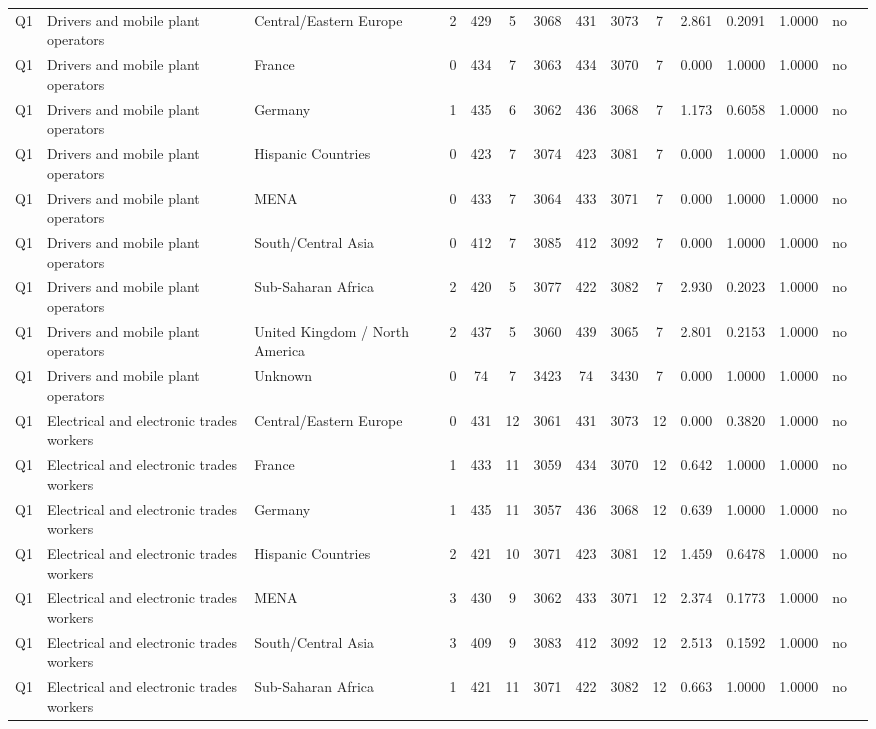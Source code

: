 \begin{longtable}{lllrcccccccccll}
Q1 & Drivers and mobile plant operators & Central/Eastern Europe & 2 & 429 & 5 & 3068 & 431 & 3073 & 7 & 2.861 & 0.2091 & 1.0000 & no \\
Q1 & Drivers and mobile plant operators & France & 0 & 434 & 7 & 3063 & 434 & 3070 & 7 & 0.000 & 1.0000 & 1.0000 & no \\
Q1 & Drivers and mobile plant operators & Germany & 1 & 435 & 6 & 3062 & 436 & 3068 & 7 & 1.173 & 0.6058 & 1.0000 & no \\
Q1 & Drivers and mobile plant operators & Hispanic Countries & 0 & 423 & 7 & 3074 & 423 & 3081 & 7 & 0.000 & 1.0000 & 1.0000 & no \\
Q1 & Drivers and mobile plant operators & MENA & 0 & 433 & 7 & 3064 & 433 & 3071 & 7 & 0.000 & 1.0000 & 1.0000 & no \\
Q1 & Drivers and mobile plant operators & South/Central Asia & 0 & 412 & 7 & 3085 & 412 & 3092 & 7 & 0.000 & 1.0000 & 1.0000 & no \\
Q1 & Drivers and mobile plant operators & Sub-Saharan Africa & 2 & 420 & 5 & 3077 & 422 & 3082 & 7 & 2.930 & 0.2023 & 1.0000 & no \\
Q1 & Drivers and mobile plant operators & United Kingdom / North America & 2 & 437 & 5 & 3060 & 439 & 3065 & 7 & 2.801 & 0.2153 & 1.0000 & no \\
Q1 & Drivers and mobile plant operators & Unknown & 0 & 74 & 7 & 3423 & 74 & 3430 & 7 & 0.000 & 1.0000 & 1.0000 & no \\
Q1 & Electrical and electronic trades workers & Central/Eastern Europe & 0 & 431 & 12 & 3061 & 431 & 3073 & 12 & 0.000 & 0.3820 & 1.0000 & no \\
Q1 & Electrical and electronic trades workers & France & 1 & 433 & 11 & 3059 & 434 & 3070 & 12 & 0.642 & 1.0000 & 1.0000 & no \\
Q1 & Electrical and electronic trades workers & Germany & 1 & 435 & 11 & 3057 & 436 & 3068 & 12 & 0.639 & 1.0000 & 1.0000 & no \\
Q1 & Electrical and electronic trades workers & Hispanic Countries & 2 & 421 & 10 & 3071 & 423 & 3081 & 12 & 1.459 & 0.6478 & 1.0000 & no \\
Q1 & Electrical and electronic trades workers & MENA & 3 & 430 & 9 & 3062 & 433 & 3071 & 12 & 2.374 & 0.1773 & 1.0000 & no \\
Q1 & Electrical and electronic trades workers & South/Central Asia & 3 & 409 & 9 & 3083 & 412 & 3092 & 12 & 2.513 & 0.1592 & 1.0000 & no \\
Q1 & Electrical and electronic trades workers & Sub-Saharan Africa & 1 & 421 & 11 & 3071 & 422 & 3082 & 12 & 0.663 & 1.0000 & 1.0000 & no \\

\end{longtable}
